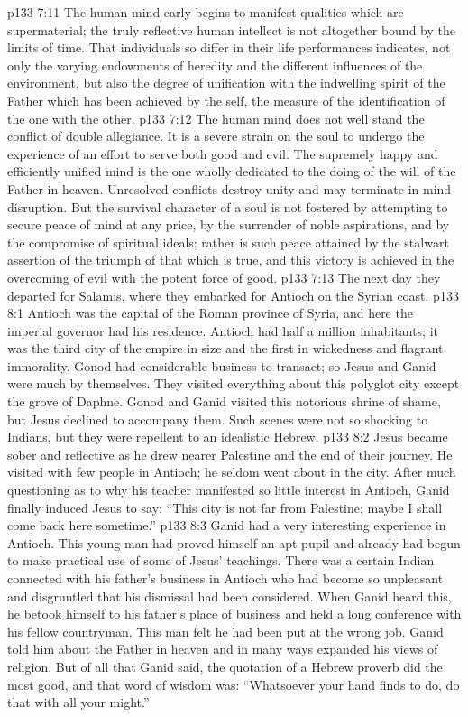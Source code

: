 \vs p133 7:11 \textcolor{ubdarkred}{The human mind early begins to manifest qualities which are supermaterial; the truly reflective human intellect is not altogether bound by the limits of time. That individuals so differ in their life performances indicates, not only the varying endowments of heredity and the different influences of the environment, but also the degree of unification with the indwelling spirit of the Father which has been achieved by the self, the measure of the identification of the one with the other.}
\vs p133 7:12 \textcolor{ubdarkred}{The human mind does not well stand the conflict of double allegiance. It is a severe strain on the soul to undergo the experience of an effort to serve both good and evil. The supremely happy and efficiently unified mind is the one wholly dedicated to the doing of the will of the Father in heaven. Unresolved conflicts destroy unity and may terminate in mind disruption. But the survival character of a soul is not fostered by attempting to secure peace of mind at any price, by the surrender of noble aspirations, and by the compromise of spiritual ideals; rather is such peace attained by the stalwart assertion of the triumph of that which is true, and this victory is achieved in the overcoming of evil with the potent force of good.}
\pc \vs p133 7:13 The next day they departed for Salamis, where they embarked for Antioch on the Syrian coast.
\vs p133 8:1 Antioch was the capital of the Roman province of Syria, and here the imperial governor had his residence. Antioch had half a million inhabitants; it was the third city of the empire in size and the first in wickedness and flagrant immorality. Gonod had considerable business to transact; so Jesus and Ganid were much by themselves. They visited everything about this polyglot city except the grove of Daphne. Gonod and Ganid visited this notorious shrine of shame, but Jesus declined to accompany them. Such scenes were not so shocking to Indians, but they were repellent to an idealistic Hebrew.
\vs p133 8:2 Jesus became sober and reflective as he drew nearer Palestine and the end of their journey. He visited with few people in Antioch; he seldom went about in the city. After much questioning as to why his teacher manifested so little interest in Antioch, Ganid finally induced Jesus to say: \textcolor{ubdarkred}{“This city is not far from Palestine; maybe I shall come back here sometime.”}
\pc \vs p133 8:3 Ganid had a very interesting experience in Antioch. This young man had proved himself an apt pupil and already had begun to make practical use of some of Jesus’ teachings. There was a certain Indian connected with his father’s business in Antioch who had become so unpleasant and disgruntled that his dismissal had been considered. When Ganid heard this, he betook himself to his father’s place of business and held a long conference with his fellow countryman. This man felt he had been put at the wrong job. Ganid told him about the Father in heaven and in many ways expanded his views of religion. But of all that Ganid said, the quotation of a Hebrew proverb did the most good, and that word of wisdom was: “Whatsoever your hand finds to do, do that with all your might.”
